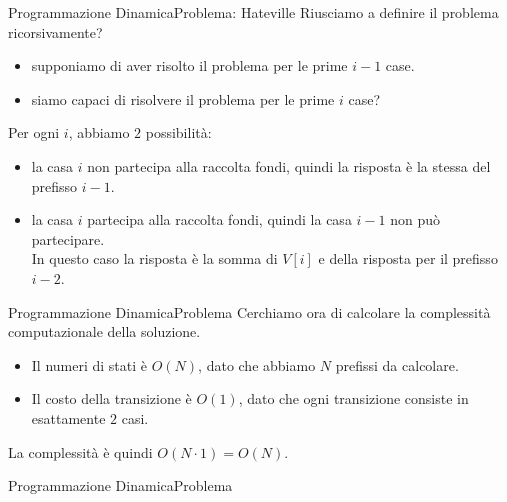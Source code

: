 \documentclass{beamer}
\begin{document}
\begin{frame}{Programmazione Dinamica}{Problema: Hateville}
    Riusciamo a definire il problema ricorsivamente?
    \pause
    \begin{itemize}
        \item supponiamo di aver risolto il problema per le prime $i-1$ case.
        \item siamo capaci di risolvere il problema per le prime $i$ case?
    \end{itemize}
    \pause
    Per ogni $i$, abbiamo $2$ possibilit\`a:
    \begin{itemize}
        \item la casa $i$ non partecipa alla raccolta fondi, quindi la risposta \`e la stessa del prefisso $i-1$.
        \item la casa $i$ partecipa alla raccolta fondi, quindi la casa $i-1$ non pu\`o partecipare.\\
        In questo caso la risposta \`e la somma di $V[i]$ e della risposta per il prefisso $i-2$.
    \end{itemize}
\end{frame}

\begin{frame}{Programmazione Dinamica}{Problema}
    Cerchiamo ora di calcolare la complessit\`a computazionale della soluzione.\\
    \pause
    \begin{itemize}
        \item Il numeri di stati è $O(N)$, dato che abbiamo $N$ prefissi da calcolare.
        \pause
        \item Il costo della transizione \`e $O(1)$, dato che ogni transizione consiste in esattamente $2$ casi.
    \end{itemize}
    \pause
    La complessit\`a \`e quindi $O(N \cdot 1) = O(N)$.
\end{frame}

\begin{frame}{Programmazione Dinamica}{Problema}
\end{frame}
\end{document}
